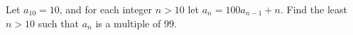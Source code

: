 Let $a_{10} = 10$,  and for each integer $n >10$ let $a_n = 100a_{n - 1} + n$. Find the least $n > 10$ such that $a_n$ is a multiple of $99$.